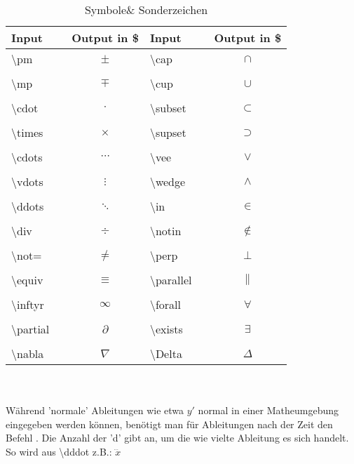 \documentclass[titlepage=firstiscover]{scrartcl}
\begin{document}
\begin{table}
  \centering
  \caption{Symbole\& Sonderzeichen}
  \label{tab:sym}
  \begin{tabular}{l c c l c c} %
    \toprule
    Input & & Output in \$ & Input & & Output in \$
    \\
    \midrule
    \textbackslash pm & & $\pm$ & \textbackslash cap & & $\cap$ \\
    \\
    \textbackslash mp & & $\mp$ & \textbackslash cup & & $\cup$ \\
    \\
    \textbackslash cdot & & $\cdot$ &\textbackslash subset & & $\subset$ \\
    \\
    \textbackslash times & & $\times$ &\textbackslash supset & & $\supset$ \\
    \\
    \textbackslash cdots & & $\cdots$ &\textbackslash vee & & $\vee$ \\
    \\
    \textbackslash vdots & & $\vdots$ &\textbackslash wedge & & $\wedge$ \\
    \\
    \textbackslash ddots & & $\ddots$ &\textbackslash in & & $\in$ \\
    \\
    \textbackslash div & & $\div$ &\textbackslash notin & & $\notin$ \\
    \\
    \textbackslash not= & & $\not=$ &\textbackslash perp & & $\perp$ \\
    \\
    \textbackslash equiv & & $\equiv$ &\textbackslash parallel & & $\parallel$\\
    \\
    \textbackslash inftyr & & $\infty$ &\textbackslash forall & & $\forall$ \\
    \\
    \textbackslash partial & & $\partial$ &\textbackslash exists & & $\exists$ \\
    \\
    \textbackslash nabla & & $\nabla$ &\textbackslash Delta & & $\Delta$ \\
    \bottomrule
  \end{tabular}
\end{table}
\\
\\
Während 'normale' Ableitungen wie etwa $y'$ normal in einer Matheumgebung
eingegeben werden können, benötigt man für Ableitungen nach der Zeit
den Befehl . Die Anzahl der 'd' gibt an, um die wie vielte
Ableitung es sich handelt. So wird aus \textbackslash dddot z.B.:
$\dddot x$ \\
\end{document}
